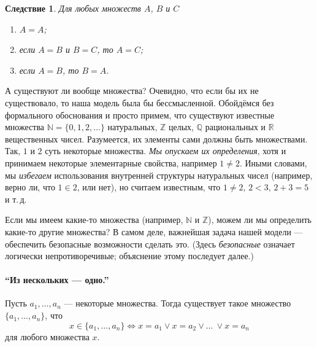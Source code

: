 \documentclass[12pt,notitlepage]{article}
\theoremstyle{plain}
\newtheorem{corr}[thm]{Следствие}
\theoremstyle{definition}
\theoremstyle{plain}
\newcommand{\N}{\mathbb{N}}
\newcommand{\Z}{\mathbb{Z}}
\newcommand{\Q}{\mathbb{Q}}
\newcommand{\R}{\mathbb{R}}
\newcommand{\void}{\varnothing}
\newcommand{\1}{\mathbf{1}}
\newcommand{\0}{\mathbf{0}}
\newcommand{\mcomm}[1]{}
\begin{document}
\begin{corr}\label{ch0:id}
	Для любых множеств $A$, $B$ и $C$
	\begin{enumerate}
		\item $A = A$;
		\item если $A = B$ и $B = C$, то $A = C$;
		\item если $A = B$, то $B = A$.
	\end{enumerate}
\end{corr}

А существуют ли вообще множества? Очевидно, что если бы их не существовало, то наша модель была бы бессмысленной. Обойдёмся без формального обоснования и просто примем, что существуют известные множества $\N = \{0,1,2,\ldots \}$ натуральных, $\Z$ целых, $\Q$ рациональных и $\R$ вещественных чисел. Разумеется, их элементы сами должны быть множествами. Так, $1$ и $2$ суть некоторые множества. \emph{Мы опускаем их определения}, хотя и принимаем некоторые элементарные свойства, например $1 \neq 2$. Иными словами, мы \emph{избегаем} использования внутренней структуры натуральных чисел (например, верно ли, что $1 \in 2$, или нет), но считаем известным, что $1 \neq 2$, $2 < 3$, $2 + 3 = 5$ и т.\,д.

\mcomm{I usually tell the students that from the standard definition of $\N$ it follows that $0 = \void$ and $n + 1 = \{0,1,\ldots,n\}$ for each $n$; then I ask them not to use these equations in their proofs since we currently have no means to make this \emph{recursive} `definition' rigorous. 
	\medskip\\
	When solving class problems, the Instructor should warn the students against making their examples dependent on whether $3 \neq \{ 4 \}$ etc. They had better look for \emph{simpler} examples based on sets whose elements are known for sure, like $\void$, $\{ \void \}$, etc.}

Если мы имеем какие-то множества (например, $\N$ и $\Z$), можем ли мы определить какие-то другие множества? В самом деле, важнейшая задача нашей модели --- обеспечить безопасные возможности сделать это. (Здесь \emph{безопасные} означает логически непротиворечивые; объяснение этому последует далее.)

\paragraph{``Из нескольких --- одно.''} Пусть $a_1,\ldots,a_n$ --- некоторые множества. Тогда существует такое множество $\{a_1,\ldots,a_n \}$, что
$$x \in \{a_1,\ldots,a_n\} \iff x = a_1 \vee x = a_2 \vee \ldots\ \vee x = a_n$$
для любого множества $x$.
\end{document}
